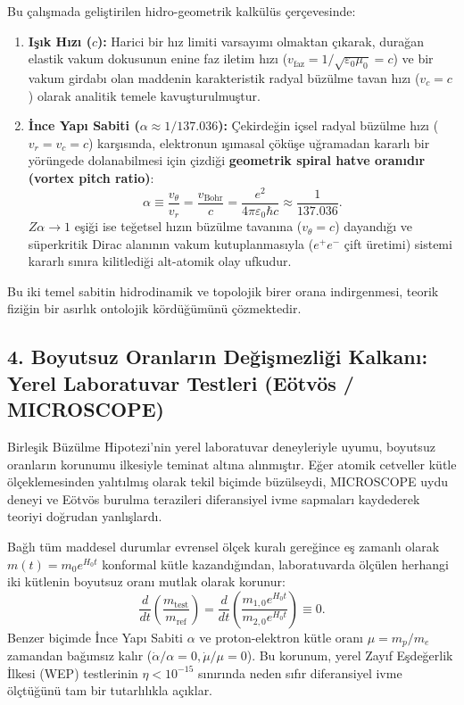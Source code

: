 Bu çalışmada geliştirilen hidro-geometrik kalkülüs çerçevesinde:
\begin{enumerate}
    \item \textbf{Işık Hızı ($c$):} Harici bir hız limiti varsayımı olmaktan çıkarak, durağan elastik vakum dokusunun enine faz iletim hızı ($v_{\mathrm{faz}} = 1/\sqrt{\varepsilon_0\mu_0} = c$) ve bir vakum girdabı olan maddenin karakteristik radyal büzülme tavan hızı ($v_c = c$) olarak analitik temele kavuşturulmuştur.
    \item \textbf{İnce Yapı Sabiti ($\alpha \approx 1/137.036$):} Çekirdeğin içsel radyal büzülme hızı ($v_r = v_c = c$) karşısında, elektronun ışımasal çöküşe uğramadan kararlı bir yörüngede dolanabilmesi için çizdiği \textbf{geometrik spiral hatve oranıdır (vortex pitch ratio)}:
          \begin{equation}
              \alpha \equiv \frac{v_\theta}{v_r} = \frac{v_{\mathrm{Bohr}}}{c} = \frac{e^2}{4\pi\varepsilon_0\hbar c} \approx \frac{1}{137.036}.
          \end{equation}
          $Z\alpha \to 1$ eşiği ise teğetsel hızın büzülme tavanına ($v_\theta = c$) dayandığı ve süperkritik Dirac alanının vakum kutuplanmasıyla ($e^+ e^-$ çift üretimi) sistemi kararlı sınıra kilitlediği alt-atomik olay ufkudur.
\end{enumerate}
Bu iki temel sabitin hidrodinamik ve topolojik birer orana indirgenmesi, teorik fiziğin bir asırlık ontolojik kördüğümünü çözmektedir.

\subsection*{4. Boyutsuz Oranların Değişmezliği Kalkanı: Yerel Laboratuvar Testleri (Eötvös / MICROSCOPE)}

Birleşik Büzülme Hipotezi'nin yerel laboratuvar deneyleriyle uyumu, boyutsuz oranların korunumu ilkesiyle teminat altına alınmıştır. Eğer atomik cetveller kütle ölçeklemesinden yalıtılmış olarak tekil biçimde büzülseydi, MICROSCOPE uydu deneyi ve Eötvös burulma terazileri diferansiyel ivme sapmaları kaydederek teoriyi doğrudan yanlışlardı.

Bağlı tüm maddesel durumlar evrensel ölçek kuralı gereğince eş zamanlı olarak $m(t) = m_0 e^{H_0 t}$ konformal kütle kazandığından, laboratuvarda ölçülen herhangi iki kütlenin boyutsuz oranı mutlak olarak korunur:
\begin{equation}
    \frac{d}{dt} \left( \frac{m_{\mathrm{test}}}{m_{\mathrm{ref}}} \right) = \frac{d}{dt} \left( \frac{m_{1,0} e^{H_0 t}}{m_{2,0} e^{H_0 t}} \right) \equiv 0.
\end{equation}
Benzer biçimde İnce Yapı Sabiti $\alpha$ ve proton-elektron kütle oranı $\mu = m_p/m_e$ zamandan bağımsız kalır ($\dot{\alpha}/\alpha = 0, \dot{\mu}/\mu = 0$). Bu korunum, yerel Zayıf Eşdeğerlik İlkesi (WEP) testlerinin $\eta < 10^{-15}$ sınırında neden sıfır diferansiyel ivme ölçtüğünü tam bir tutarlılıkla açıklar.

